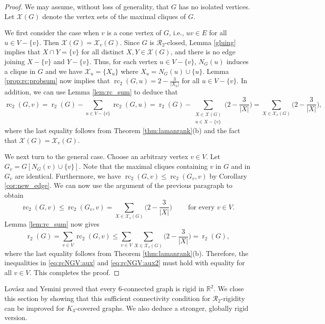 \documentclass[11pt,a4paper]{article}
\theoremstyle{definition}
\DeclareMathOperator{\rr}{r}
\DeclareMathOperator{\rc}{rc}
\newcommand{\cR}{\mathcal{R}}
\newcommand{\cX}{\mathcal{X}}
\newcommand{\R}{\mathbb{R}}
\newcommand{\XX}{\mathcal{X}}
\begin{document}
\begin{proof} %
We may assume, without loss of generality, that $G$ has no isolated vertices. Let $\cX(G)$ denote the vertex sets of the maximal cliques of $G$.

We first consider the case when  $v$ is a cone vertex of $G$, i.e., $uv\in E$ for all $u\in V-\{v\}$. 
Then $\mathcal{X}(G)=\mathcal{X}_v(G)$. 
Since $G$ is $\mathcal{R}_2$-closed, Lemma \ref{gluing} implies that $X\cap Y=\{v\}$ for all distinct $X,Y\in \XX(G)$, and there is no edge joining $X-\{v\}$ and $Y-\{v\}$. Thus, for each vertex $u\in V-\{v\}$, $N_G(u)$ induces a clique in $G$ and we have $\cX_u=\{X_u\}$ where $X_u=N_G(u)\cup \{u\}$. Lemma \ref{prop:rc:probsum} 
now implies that $\rc_2(G,u)=2-\frac{3}{|X_u|}$ for all $u\in V-\{v\}$. In addition,
we can use Lemma \ref{lem:rc_sum} to deduce that
$$\rc_2(G,v)=\rr_2(G)-\sum_{u\in V-\{v\}}\rc_2(G,u)=\rr_2(G)-\sum_{\substack{X\in \XX(G)\\ u\in X-\{v\}}}\Big(2-\frac{3}{|X|}\Big)=\sum_{X\in \mathcal{X}_v(G)}\Big(2-\frac{3}{|X|}\Big),$$
where the last equality follows from Theorem \ref{thm:lamanrank}(b) and the fact that $\mathcal{X}(G)=\mathcal{X}_v(G)$.

We next turn to the general case. Choose an arbitrary vertex $v\in V$. Let $G_v=G[N_G(v)\cup \{v\}]$.
Note that the maximal cliques containing $v$ in $G$ and in $G_v$ are
identical. Furthermore, we have
$\rc_2(G,v) \leq \rc_2(G_v,v)$ by Corollary \ref{cor:new_edge}. 
We can now use the argument of the previous paragraph to obtain
\begin{equation}\label{eq:rcNGV:aux}
\rc_2(G,v) \leq \rc_2(G_v,v) = \sum_{X\in \XX_v(G)}\Big(2-\frac{3}{|X|}\Big)
\qquad \text{ for every } v\in V.
\end{equation}
Lemma \ref{lem:rc_sum} now gives 
\begin{equation}
\label{eq:rcNGV:aux2}
\rr_2(G)=\sum_{v\in V}\rc_2(G,v)\leq \sum_{v\in V}\sum_{X\in \mathcal{X}_v(G)}\Big(2-\frac{3}{|X|}\Big)=\rr_2(G),
\end{equation}
where the last equality follows from Theorem \ref{thm:lamanrank}(b). Therefore,  the inequalities in \eqref{eq:rcNGV:aux}
and \eqref{eq:rcNGV:aux2}
must hold with equality for all $v\in V$. This completes the proof.
\end{proof}


Lov\'asz and Yemini \cite{LY} proved that every 6-connected graph is rigid in $\R^2$.
We close this section by showing that this  sufficient connectivity condition for $\cR_2$-rigidity can be improved for $K_3$-covered graphs. We also deduce a
stronger, globally rigid version.
\end{document}
